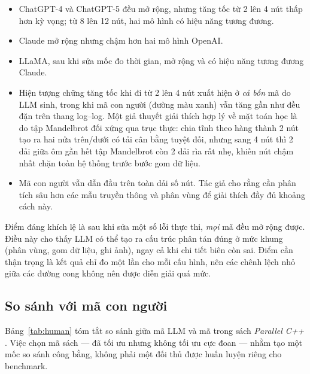 \begin{itemize}
  \item ChatGPT-4 và ChatGPT-5 đều mở rộng, nhưng tăng tốc từ 2 lên 4 nút thấp
        hơn kỳ vọng; từ 8 lên 12 nút, hai mô hình có hiệu năng tương đương.
  \item Claude mở rộng nhưng chậm hơn hai mô hình OpenAI.
  \item LLaMA, sau khi sửa mốc đo thời gian, mở rộng và có hiệu năng tương đương
        Claude.
  \item Hiện tượng chững tăng tốc khi đi từ 2 lên 4 nút xuất hiện ở \emph{cả bốn}
        mã do LLM sinh, trong khi mã con người (đường màu xanh) vẫn tăng gần như
        đều đặn trên thang log--log. Một giả thuyết giải thích hợp lý về mặt toán
        học là do tập Mandelbrot đối xứng qua trục thực: chia tĩnh theo hàng thành
        2 nút tạo ra hai nửa trên/dưới có tải cân bằng tuyệt đối, nhưng sang 4 nút
        thì 2 dải giữa ôm gần hết tập Mandelbrot còn 2 dải rìa rất nhẹ, khiến nút
        chậm nhất chặn toàn hệ thống trước bước gom dữ liệu.
  \item Mã con người vẫn dẫn đầu trên toàn dải số nút. Tác giả cho rằng cần phân
        tích sâu hơn các mẫu truyền thông và phân vùng để giải thích đầy đủ khoảng
        cách này.
\end{itemize}

Điểm đáng khích lệ là sau khi sửa một số lỗi thực thi, \emph{mọi} mã đều mở rộng
được. Điều này cho thấy LLM có thể tạo ra cấu trúc phân tán đúng ở mức khung
(phân vùng, gom dữ liệu, ghi ảnh), ngay cả khi chi tiết biên còn sai. Điểm cần
thận trọng là kết quả chỉ đo một lần cho mỗi cấu hình, nên các chênh lệch nhỏ
giữa các đường cong không nên được diễn giải quá mức.

\subsection{So sánh với mã con người}

Bảng~\ref{tab:human} tóm tắt so sánh giữa mã LLM và mã trong sách
\emph{Parallel C++} \cite{diehl2024book}. Việc chọn mã sách — đã tối ưu nhưng
không tối ưu cực đoan — nhằm tạo một mốc so sánh công bằng, không phải một đối
thủ được huấn luyện riêng cho benchmark.


